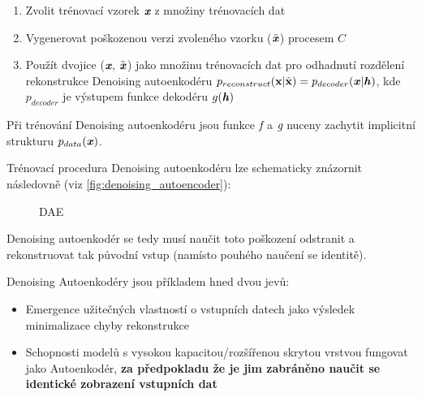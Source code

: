 \begin{enumerate}
    \item Zvolit trénovací vzorek $\emph{\textbf{x}}$ z množiny trénovacích dat
    \item Vygenerovat poškozenou verzi zvoleného vzorku ($\tilde{\textbf{\emph{x}}}$) procesem $C$
    \item Použít dvojice ($\emph{\textbf{x}}$, $\tilde{\textbf{\emph{x}}}$) jako množinu trénovacích dat pro odhadnutí rozdělení rekonstrukce Denoising autoenkodéru $p_{reconstruct}(\textbf{x} | \tilde{\textbf{x}}) = p_{decoder}(\textbf{\emph{x}}|\textbf{\emph{h}})$, kde $p_{decoder}$ je výstupem funkce dekodéru $g(\textbf{\emph{h}})$
\end{enumerate}

Při trénování Denoising autoenkodéru jsou funkce $\emph{f}$ a $\emph{g}$ nuceny zachytit implicitní strukturu $p_{data}(\textbf{\emph{x}})$.

Trénovací procedura Denoising autoenkodéru lze schematicky znázornit následovně (viz \autoref{fig:denoising_autoencoder}):

\begin{figure}[h]
    \centering
    \caption{DAE}
    \label{fig:denoising_autoencoder}
\end{figure}

Denoising autoenkodér se tedy musí naučit toto poškození odstranit a rekonstruovat tak původní vstup (namísto pouhého naučení se identitě).

Denoising Autoenkodéry jsou příkladem hned dvou jevů:
\begin{itemize}
    \item Emergence užitečných vlastností o vstupních datech jako výsledek minimalizace chyby rekonstrukce
    \item Schopnosti modelů s vysokou kapacitou/rozšířenou skrytou vrstvou fungovat jako Autoenkodér, \textbf{za předpokladu že je jim zabráněno naučit se identické zobrazení vstupních dat}
\end{itemize}

